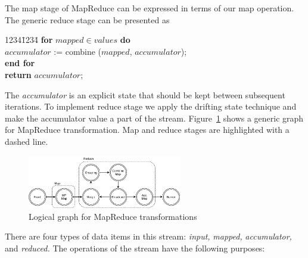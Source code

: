
\label{fs-drifting}

The map stage of MapReduce can be expressed in terms of our map operation. 
The generic reduce stage can be presented as

\begin {tabbing}
1234\=1234\= \kill
{\bf for} $mapped \in values$ {\bf do}   \\
\>$accumulator$ := combine ($mapped$, $accumulator$); \\
{\bf end for} \\
{\bf return } $accumulator$;
\end {tabbing}

The {\it accumulator} is an explicit state that should be kept between subsequent iterations.
%
%
To implement reduce stage we apply the drifting state technique and make the accumulator value a part of the stream. 
Figure~\ref{mapreduce-graph-figure} shows a generic graph for MapReduce transformation. 
Map and reduce stages are highlighted with a dashed line. 

\begin{figure}[ht]
  \centering
  \includegraphics[width=0.6\textwidth]{pics/mapreduce}
  \caption{Logical graph for MapReduce transformations}
  \label {mapreduce-graph-figure}
\end{figure}

There are four types of data items in this stream: {\it input,} {\it mapped,}   {\it accumulator,} and {\it  reduced.} 
The operations of the stream have the following purposes:


